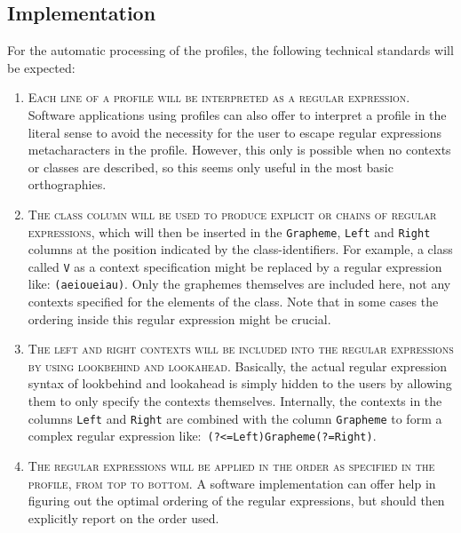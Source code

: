 \subsection*{Implementation}
For the automatic processing of the profiles, the following technical standards
will be expected:

\begin{enumerate}
	\def\labelenumi{B\arabic{enumi}.} 
	\item \textsc{Each line of a profile will be interpreted as a regular
       expression. }Software applications using profiles can also offer to
       interpret a profile in the literal sense to avoid the necessity for the
       user to escape regular expressions metacharacters in the profile.
       However, this only is possible when no contexts or classes are described,
       so this seems only useful in the most basic orthographies. 
	\item \textsc{The \textsc{class} column will be used to produce explicit
       \textsc{or} chains of regular expressions}, which will then be inserted
       in the \texttt{Grapheme}, \texttt{Left} and \texttt{Right} columns at
       the position indicated by the class-identifiers. For example, a class
       called \texttt{V} as a context specification might be replaced by a regular
       expression like:
       \texttt{(a\textbar{}e\textbar{}i\textbar{}o\textbar{}u\textbar{}ei\textbar{}au)}.
       Only the graphemes themselves are included here, not any contexts
       specified for the elements of the class. Note that in some cases the 
       ordering inside this regular expression might be crucial.
	\item \textsc{The \textsc{left} and \textsc{right} contexts will be included
       into the regular expressions by using lookbehind and lookahead}.
       Basically, the actual regular expression syntax of lookbehind and
       lookahead is simply hidden to the users by allowing them to only specify
       the contexts themselves. Internally, the contexts in the columns
       \texttt{Left} and \texttt{Right} are combined with the column
       \texttt{Grapheme} to form a complex regular expression like:\ 
       \texttt{(?\textless{}=Left)Grapheme(?=Right)}. 
	\item \textsc{The regular expressions will be applied in the order as specified
       in the profile, from top to bottom.} A software implementation can offer
       help in figuring out the optimal ordering of the regular expressions, but
       should then explicitly report on the order used.      
\end{enumerate}

